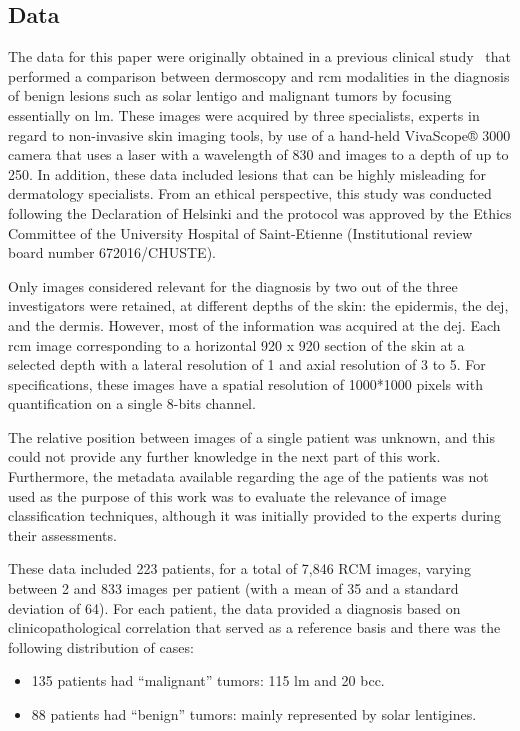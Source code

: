 \documentclass[journal,article,accept,moreauthors,pdftex, applsci]{Definitions/mdpi}
\begin{document}
\subsection{Data}
\label{sec:data}
The data for this paper were originally obtained in a previous clinical study~\cite{Cinotti2018} that performed a comparison between dermoscopy and \ac{rcm} modalities in the diagnosis of benign lesions such as solar lentigo and malignant tumors by focusing essentially on \ac{lm}. These images were acquired by three specialists, experts in regard to non-invasive skin imaging tools, by use of a hand-held VivaScope® 3000 camera that uses a laser with a wavelength of \unit{830}{\nano\meter} and images to a depth of up to \unit{250}{\micro\meter}. In addition, these data included lesions that can be highly misleading for dermatology specialists. From an ethical perspective, this study was conducted following the Declaration of Helsinki and the protocol was approved by the Ethics Committee of the University Hospital of Saint-Etienne (Institutional review board number 672016/CHUSTE).\par
Only images considered relevant for the diagnosis by two out of the three investigators were retained, at different depths of the skin: the epidermis, the \ac{dej}, and the dermis. However, most of the information was acquired at the \ac{dej}. Each \ac{rcm} image corresponding to a horizontal \unit{920}{\micro\meter} x \unit{920}{\micro\meter} section of the skin at a selected depth with a lateral resolution of \unit{1}{\micro\meter} and axial resolution of \unit{3}{\micro\meter} to \unit{5}{\micro\meter}. For specifications, these images have a spatial resolution of 1000*1000 pixels with quantification on a single 8-bits channel.\par
The relative position between images of a single patient was unknown, and this could not provide any further knowledge in the next part of this work. Furthermore, the metadata available regarding the age of the patients was not used as the purpose of this work was to evaluate the relevance of image classification techniques, although it was initially provided to the experts during their assessments.\par
These data included 223 patients, for a total of 7,846 RCM images, varying between 2 and 833 images per patient (with a mean of 35 and a standard deviation of 64). For each patient, the data provided a diagnosis based on clinicopathological correlation that served as a reference basis and there was the following distribution of cases:
\begin{itemize}
\item 135 patients had “malignant” tumors: 115 \ac{lm} and 20 \ac{bcc}.
\item 88 patients had “benign” tumors: mainly represented by solar lentigines.
\end{itemize}\par
\end{document}
